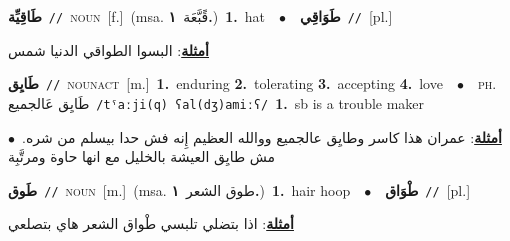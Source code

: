 \documentclass[10pt,a4paper,twoside]{article} %
\begin{document}
\begin{multicols}{2}
{\setlength\topsep{0pt}\textbf{\foreignlanguage{arabic}{طَاقِيِّة}}\ {\color{gray}\texttt{//}\color{black}}\ \textsc{noun}\ [f.]\ \color{gray}(msa. \foreignlanguage{arabic}{قًبَّعَة}~\foreignlanguage{arabic}{\textbf{١.}})\color{black}\ \textbf{1.}~hat\ \ $\bullet$\ \ \setlength\topsep{0pt}\textbf{\foreignlanguage{arabic}{طَوَاقِي}}\ {\color{gray}\texttt{//}\color{black}}\ [pl.]\  \begin{flushright}\color{gray}\foreignlanguage{arabic}{\textbf{\underline{\foreignlanguage{arabic}{أمثلة}}}: البسوا الطواقي الدنيا شمس}\end{flushright}\color{black}} \vspace{2mm}

{\setlength\topsep{0pt}\textbf{\foreignlanguage{arabic}{طَايِق}}\ {\color{gray}\texttt{//}\color{black}}\ \textsc{noun\textunderscore act}\ [m.]\ \textbf{1.}~enduring  \textbf{2.}~tolerating  \textbf{3.}~accepting  \textbf{4.}~love\ \ $\bullet$\ \ \textsc{ph.} \color{gray} \foreignlanguage{arabic}{طَايِق عَالجميع}\color{black}\ {\color{gray}\texttt{/{\sffamily tˤaːji(q) ʕal(dʒ)amiːʕ}/}\color{black}}\ \textbf{1.}~sb is a trouble maker\  \begin{flushright}\color{gray}\foreignlanguage{arabic}{\textbf{\underline{\foreignlanguage{arabic}{أمثلة}}}: عمران هذا كاسر وطايِق عالجميع ووالله العظيم إِنه فش حدا بيسلم من شره.\ $\bullet$\ \  مش طايِق العيشة بالخليل مع انها حاوة ومرتَّبِة}\end{flushright}\color{black}} \vspace{2mm}

{\setlength\topsep{0pt}\textbf{\foreignlanguage{arabic}{طَوق}}\ {\color{gray}\texttt{//}\color{black}}\ \textsc{noun}\ [m.]\ \color{gray}(msa. \foreignlanguage{arabic}{طوق الشعر}~\foreignlanguage{arabic}{\textbf{١.}})\color{black}\ \textbf{1.}~hair hoop\ \ $\bullet$\ \ \setlength\topsep{0pt}\textbf{\foreignlanguage{arabic}{طْوَاق}}\ {\color{gray}\texttt{//}\color{black}}\ [pl.]\  \begin{flushright}\color{gray}\foreignlanguage{arabic}{\textbf{\underline{\foreignlanguage{arabic}{أمثلة}}}: اذا بتضلي تلبسي طْواق الشعر  هاي بتصلعي}\end{flushright}\color{black}} \vspace{2mm}


\end{multicols}
\end{document}
